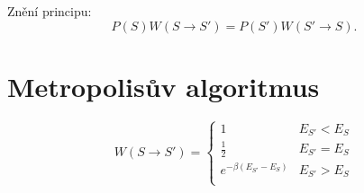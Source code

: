 \documentclass[a4paper]{article}
\begin{document}
Znění principu:
\begin{equation}
    P(S) W(S \rightarrow S') = P(S') W(S' \rightarrow S).
\end{equation}

\section{Metropolisův algoritmus}
\begin{equation}
    W(S \rightarrow S') = \begin{cases}
        1 & E_{S'} < E_S \\
        \frac{1}{2} & E_{S'} = E_S \\
        e^{-\beta(E_{S'} - E_S)} & E_{S'} > E_S \\
    \end{cases}
\end{equation}
\end{document}
